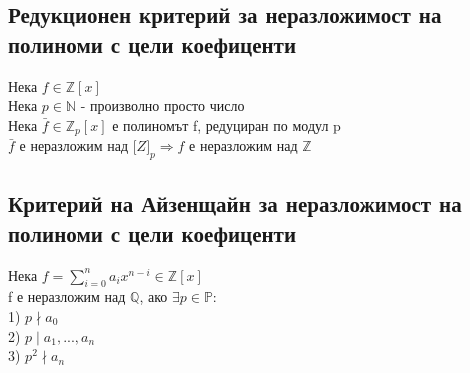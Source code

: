 \documentclass[12pt]{article}
\begin{document}
\subsection{Редукционен критерий за неразложимост на полиноми с цели коефиценти}
Нека $f \in \mathbb{Z}[x]$ \\
Нека $p \in \mathbb{N}$ - произволно просто число \\
Нека $\bar{f} \in \mathbb{Z}_p[x]$ е полиномът f, редуциран по модул p \\
$\bar{f}$ е неразложим над $\mathbb[Z]_p \Rightarrow f$ е неразложим над $\mathbb{Z}$

\subsection{Критерий на Айзенщайн за неразложимост на полиноми с цели коефиценти}
Нека $f = \sum\limits_{i=0}^{n}a_ix^{n-i} \in \mathbb{Z}[x]$ \\
f е неразложим над $\mathbb{Q}$, ако $\exists p \in \mathbb{P}: $\\
1) $p \nmid a_0$ \\
2) $p \mid a_1, ..., a_n$ \\
3) $p^2 \nmid a_n$
\end{document}
